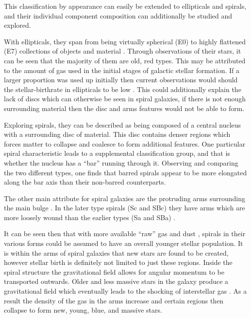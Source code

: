 \documentclass[12pt, twocolumn]{revtex4-1}    %
\begin{document}
This classification by appearance can easily be extended to ellipticals and spirals, and their individual component composition can additionally be studied and explored. 

With ellipticals, they span from being virtually spherical (E0) to highly flattened (E7) collections of objects and material \citep{moore_databook}. Through observations of their stars, it can be seen that the majority of them are old, red types. This may be attributed to the amount of gas used in the initial stages of galactic stellar formation. If a larger proportion was used up initially then current observations would should the stellar-birthrate in ellipticals to be low \citep{carroll_astro}. This could additionally explain the lack of discs which can otherwise be seen in spiral galaxies, if there is not enough surrounding material then the disc and arms features would not be able to form.

Exploring spirals, they can be described as being composed of a central nucleus with a surrounding disc of material. This disc contains denser regions which forces matter to collapse and coalesce to form additional features. One particular spiral characteristic leads to a supplemental classification group, and that is whether the nucleus has a ``bar'' running through it. Observing and comparing the two different types, one finds that barred spirals appear to be more elongated along the bar axis than their non-barred counterparts. 

The other main attribute for spiral galaxies are the protruding arms surrounding the main bulge \citep{carroll_astro}. In the later type spirals (Sc and SBc) they have arms which are more loosely wound than the earlier types (Sa and SBa) \citep{moore_databook}.

It can be seen then that with more available ``raw'' gas and dust \citep{carroll_astro}, spirals in their various forms could be assumed to have an overall younger stellar population. It is within the arms of spiral galaxies that new stars are found to be created, however stellar birth is definitely not limited to just these regions. Inside the spiral structure the gravitational field allows for angular momentum to be transported outwards. Older and less massive stars in the galaxy produce a gravitational field which eventually leads to the shocking of interstellar gas \citep{binney_galaxies}. As a result the density of the gas in the arms increase and certain regions then collapse to form new, young, blue, and massive stars. 
\end{document}
